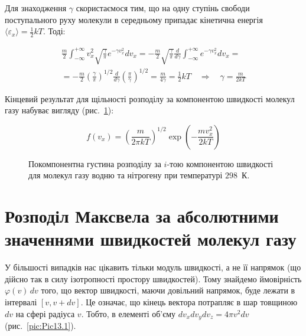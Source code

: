 Для знаходження $\gamma$ скористаємося тим, що на одну ступінь свободи поступального руху молекули в середньому припадає кінетична енергія $\langle \varepsilon_x \rangle = \frac{1}{2} kT$. Тоді:

\begin{multline} \label{eq:129.9}
\frac{m}{2}\int_{-\infty}^{+\infty} v_x^2 \sqrt{\frac{\gamma}{\pi}} e^{-\gamma v_x^2} dv_x
= -\frac{m}{2} \sqrt{\frac{\gamma}{\pi}} \frac{d}{d\gamma} \int_{-\infty}^{+\infty} e^{-\gamma v_x^2} dv_x
= \\
= -\frac{m}{2} \left( \frac{\gamma}{\pi} \right)^{1/2} \frac{d}{d\gamma} \left( \frac{\pi}{\gamma} \right)^{1/2}
= \frac{m}{4\gamma} = \frac{1}{2} kT \quad \Rightarrow \quad \gamma = \frac{m}{2kT}
\end{multline}

Кінцевий результат для щільності розподілу за компонентою швидкості молекул газу набуває вигляду (рис.~\ref{pic:Pic13.2}):

\begin{equation}
f(v_x) = \left( \frac{m}{2\pi kT} \right)^{1/2} \exp\left( - \frac{m v_x^2}{2 kT} \right)
\label{eq:129.10}
\end{equation}

\begin{figure}[h!]\centering

\caption{Покомпонентна густина розподілу за $i$-тою компонентою швидкості для молекул газу водню  та нітрогену  при температурі $298$~К.}
\label{pic:Pic13.2}
\end{figure}

\section{Розподіл Максвела за абсолютними значеннями швидкостей молекул газу}

У більшості випадків нас цікавить тільки модуль швидкості, а не її напрямок (що дійсно так в силу ізотропності простору швидкостей). Тому знайдемо ймовірність $\varphi(v)\, dv$ того, що вектор швидкості, маючи довільний напрямок, буде лежати в інтервалі $[v, v + dv]$. Це означає, що кінець вектора потрапляє в шар товщиною $dv$ на сфері радіуса $v$.
%
Тобто, в елементі об’єму $dv_x dv_y dv_z = 4 \pi v^2 dv$ (рис.~\ref{pic:Pic13.1}).

